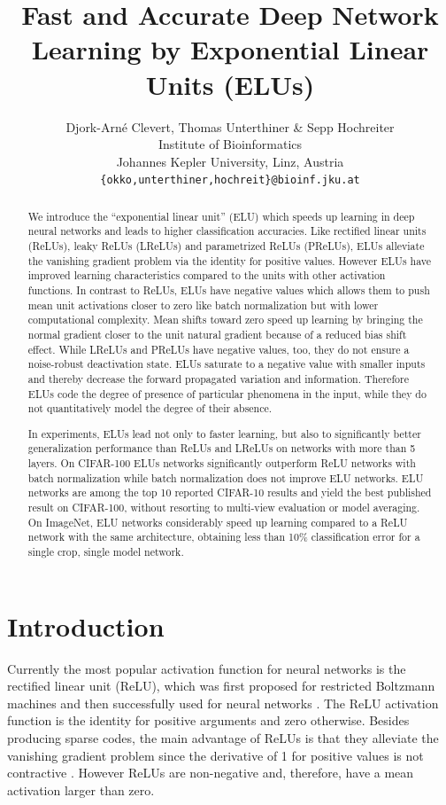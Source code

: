 \documentclass{article}
\title{Fast and Accurate Deep Network Learning by
  Exponential Linear Units (ELUs)}
\author{Djork-Arn{\'e} Clevert,
Thomas Unterthiner
\&
Sepp Hochreiter\\
Institute of Bioinformatics\\
Johannes Kepler University, Linz, Austria\\
\texttt{\{okko,unterthiner,hochreit\}@bioinf.jku.at}
}
\begin{document}
\maketitle


\begin{abstract}
We introduce the ``exponential linear unit'' (ELU)
which speeds up learning in deep neural networks and
leads to higher classification accuracies.
Like rectified linear units (ReLUs), leaky ReLUs
(LReLUs) and parametrized ReLUs (PReLUs),
ELUs alleviate the vanishing gradient problem via the identity
for positive values.
However ELUs have improved learning characteristics compared to
the units with other activation functions.
In contrast to ReLUs, ELUs have negative values which allows them
to push mean unit activations closer to zero like
batch normalization but with lower computational complexity.
Mean shifts toward zero speed up learning by bringing
the normal gradient closer to the unit natural gradient
because of a reduced bias shift effect.
While LReLUs and PReLUs have negative values, too, they
do not ensure a noise-robust deactivation state.
ELUs saturate to a negative value with smaller inputs and thereby
decrease the forward propagated variation and information.
Therefore ELUs code the degree of presence of
particular phenomena in the input, while they
do not quantitatively model the degree of their absence.

In experiments, ELUs lead not only to faster learning, but also to
significantly better generalization performance than ReLUs and LReLUs
on networks with more than 5 layers.
On CIFAR-100 ELUs networks significantly outperform ReLU networks with batch
normalization while batch normalization does not improve ELU networks.
ELU networks are among the top 10
reported CIFAR-10 results and yield the best published result on CIFAR-100,
without resorting to multi-view evaluation or model averaging.
On ImageNet, ELU networks considerably speed up learning
compared to a ReLU network with the same architecture, obtaining
less than 10\% classification error for a single crop,
single model network.
\end{abstract}


\section{Introduction}
\label{sec:intro}

Currently the most popular activation function for neural networks is
the rectified linear unit (ReLU), which was first proposed for
restricted Boltzmann machines \citep{Nair:10} and then successfully used
for neural networks \citep{Glorot:11}.
The ReLU activation function is the identity for positive
arguments and zero otherwise.
Besides producing sparse codes,
the main advantage of ReLUs is that they alleviate the vanishing
gradient problem \citep{Hochreiter:98fuzzy, Hochreiter:2001}
since the derivative of 1 for positive
values is not contractive \citep{Glorot:11}.
However ReLUs are non-negative and, therefore, have a mean
activation larger than zero.
\end{document}
